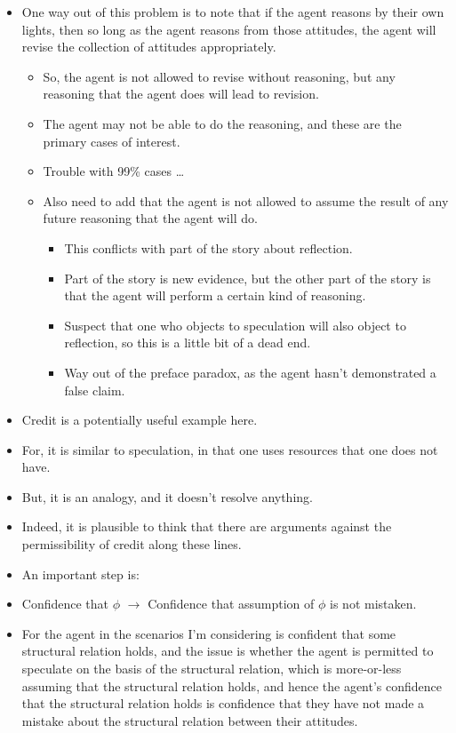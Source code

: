 \documentclass[10pt]{article}
\begin{document}
\begin{itemize}
\item One way out of this problem is to note that if the agent reasons by their own lights, then so long as the agent reasons from those attitudes, the agent will revise the collection of attitudes appropriately.
  \begin{itemize}
  \item So, the agent is not allowed to revise without reasoning, but any reasoning that the agent does will lead to revision.
  \item The agent may not be able to do the reasoning, and these are the primary cases of interest.
  \item Trouble with 99\% cases \dots
  \item Also need to add that the agent is not allowed to assume the result of any future reasoning that the agent will do.
    \begin{itemize}
    \item This conflicts with part of the story about reflection.
    \item Part of the story is new evidence, but the other part of the story is that the agent will perform a certain kind of reasoning.
    \item Suspect that one who objects to speculation will also object to reflection, so this is a little bit of a dead end.
    \item Way out of the preface paradox, as the agent hasn't demonstrated a false claim.
    \end{itemize}
  \end{itemize}
\end{itemize}

\begin{itemize}
\item Credit is a potentially useful example here.
\item For, it is similar to speculation, in that one uses resources that one does not have.
\item But, it is an analogy, and it doesn't resolve anything.
\item Indeed, it is plausible to think that there are arguments against the permissibility of credit along these lines.
\end{itemize}

\newpage

\begin{itemize}
\item An important step is:
\item Confidence that \(\phi\) \(\rightarrow\) Confidence that assumption of \(\phi\) is not mistaken.
\item For the agent in the scenarios I'm considering is confident that some structural relation holds, and the issue is whether the agent is permitted to speculate on the basis of the structural relation, which is more-or-less assuming that the structural relation holds, and hence the agent's confidence that the structural relation holds is confidence that they have not made a mistake about the structural relation between their attitudes.
\end{itemize}
\end{document}
